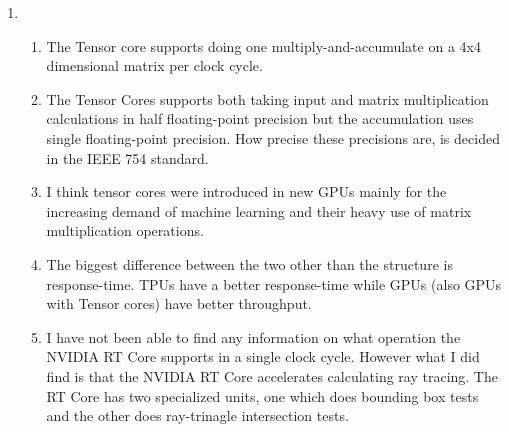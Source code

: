 \documentclass[a4paper, 12pt]{article}
\begin{document}
\begin{enumerate}
	\item
	\begin{enumerate}[label*=\arabic*.]
		\item The Tensor core supports doing one multiply-and-accumulate on a 4x4 dimensional matrix per clock cycle.
		
		\item The Tensor Cores supports both taking input and matrix multiplication calculations in half floating-point precision but the accumulation uses single floating-point precision. How precise these precisions are, is decided in the IEEE 754 standard.
		
		\item I think tensor cores were introduced in new GPUs mainly for the increasing demand of machine learning and their heavy use of matrix multiplication operations.
		
		
		
		\item The biggest difference between the two other than the structure is response-time. TPUs have a better response-time while GPUs (also GPUs with Tensor cores) have better throughput.
		
		

		\item I have not been able to find any information on what operation the NVIDIA RT Core supports in a single clock cycle. However what I did find is that the NVIDIA RT Core accelerates calculating ray tracing. The RT Core has two specialized units, one which does bounding box tests and the other does ray-trinagle intersection tests.
	\end{enumerate}


\end{enumerate}
\end{document}

